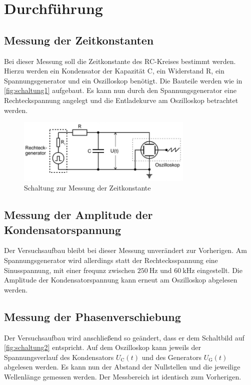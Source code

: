 \section{Durchführung}
\label{sec:Durchführung}


\subsection{Messung der Zeitkonstanten}

Bei dieser Messung soll die Zeitkonstante des RC-Kreises bestimmt werden. Hierzu werden ein Kondensator der Kapazität C, ein Widerstand R, ein Spannungsgenerator und ein Oszilloskop benötigt.
Die Bauteile werden wie in \autoref{fig:schaltung1} aufgebaut. Es kann nun durch den Spannungsgenerator eine Rechteckspannung angelegt und die Entladekurve am Oszilloskop betrachtet werden.

\begin{figure}[H]
    \centering
    \includegraphics[width=0.75\textwidth]{Dateien/Schaltung1.jpg}
    \caption{Schaltung zur Messung der Zeitkonstante}
    \label{fig:schaltung1}
\end{figure}


\subsection{Messung der Amplitude der Kondensatorspannung}

Der Versuchsaufbau bleibt bei dieser Messung unverändert zur Vorherigen. Am Spannungsgenerator wird allerdings statt der Rechtecksspannung eine Sinusspannung, mit einer frequnz zwischen
$\SI{250}{\hertz}$ und $\SI{60}{\kilo\hertz}$ eingestellt. Die Amplitude der Kondensatorspannung kann erneut am Oszilloskop abgelesen werden.


\subsection{Messung der Phasenverschiebung}

Der Versuchsaufbau wird anschließend so geändert, dass er dem Schaltbild auf \autoref{fig:schaltung2} entspricht. Auf dem Oszilloskop kann jeweils der Spannungsverlauf des Kondensators $U_{\text{C}}(t)$ und des
Generators $U_{\text{G}}(t)$ abgelesen werden. Es kann nun der Abstand der Nullstellen und die jeweilige Wellenlänge gemessen werden. Der Messbereich ist identisch zum Vorherigen.


